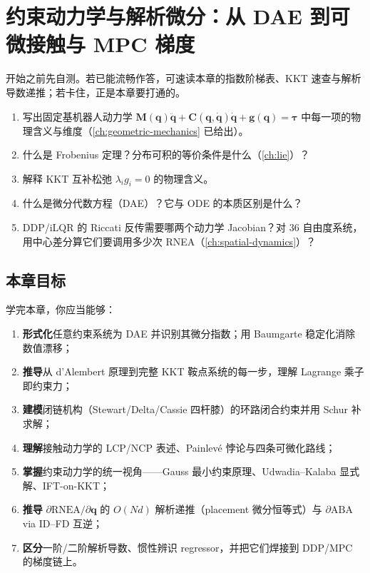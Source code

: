 \chapter{约束动力学与解析微分：从 DAE 到可微接触与 MPC 梯度}
\label{ch:constrained-dynamics}


\begin{practice}[前置自测]
开始之前先自测。若已能流畅作答，可速读本章的指数阶梯表、KKT 速查与解析导数递推；若卡住，正是本章要打通的。
\begin{enumerate}
  \item 写出固定基机器人动力学 $\mathbf M(\mathbf q)\ddot{\mathbf q}+\mathbf C(\mathbf q,\dot{\mathbf q})\dot{\mathbf q}+\mathbf g(\mathbf q)=\boldsymbol\tau$ 中每一项的物理含义与维度（\cref{ch:geometric-mechanics} 已给出）。
  \item 什么是 Frobenius 定理？分布可积的等价条件是什么（\cref{ch:lie}）？
  \item 解释 KKT 互补松弛 $\lambda_i g_i=0$ 的物理含义。
  \item 什么是微分代数方程（DAE）？它与 ODE 的本质区别是什么？
  \item DDP/iLQR 的 Riccati 反传需要哪两个动力学 Jacobian？对 $36$ 自由度系统，用中心差分算它们要调用多少次 RNEA（\cref{ch:spatial-dynamics}）？
\end{enumerate}
\end{practice}

\section*{本章目标}
学完本章，你应当能够：
\begin{enumerate}
  \item \textbf{形式化}任意约束系统为 DAE 并识别其微分指数；用 Baumgarte 稳定化消除数值漂移；
  \item \textbf{推导}从 d'Alembert 原理到完整 KKT 鞍点系统的每一步，理解 Lagrange 乘子即约束力；
  \item \textbf{建模}闭链机构（Stewart/Delta/Cassie 四杆膝）的环路闭合约束并用 Schur 补求解；
  \item \textbf{理解}接触动力学的 LCP/NCP 表述、Painlevé 悖论与四条可微化路线；
  \item \textbf{掌握}约束动力学的统一视角——Gauss 最小约束原理、Udwadia--Kalaba 显式解、IFT-on-KKT；
  \item \textbf{推导} $\partial\mathrm{RNEA}/\partial\mathbf q$ 的 $O(Nd)$ 解析递推（placement 微分恒等式）与 $\partial\mathrm{ABA}$ via ID--FD 互逆；
  \item \textbf{区分}一阶/二阶解析导数、惯性辨识 regressor，并把它们焊接到 DDP/MPC 的梯度链上。
\end{enumerate}

